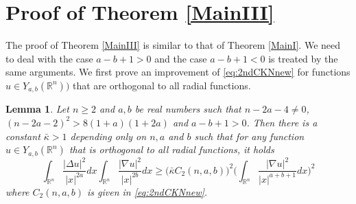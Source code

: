 \documentclass[a4paper,12pt]{article}
\theoremstyle{plain}
\newtheorem{lemma}[theorem]{Lemma}
\theoremstyle{definition}
\theoremstyle{remark}
\def\R{\mathbb R}%
\def\irn{\int_{\R^n}}
\numberwithin{equation}{section}
\begin{document}
\section{Proof of Theorem \ref{MainIII}}\label{s5}
The proof of Theorem \ref{MainIII} is similar to that of Theorem \ref{MainI}. We need to  deal with the case $a -b + 1 > 0$ and the case $a -b + 1< 0$ is treated by the same arguments. We first prove an improvement of \eqref{eq:2ndCKNnew} for functions $u\in Y_{a,b}(\R^n))$ that are orthogonal to all radial functions.
\begin{lemma}\label{Improved2ndCKN1}
Let $n\geq 2$ and $a, b$ be real numbers such that $n-2a -4\not=0$, $(n-2a -2)^2 > 8(1+a)(1+2a)$ and $a-b +1 >0$. Then there is a constant ${\bar{\kappa} >1}$ depending only on $n, a$ and $b$ such that for any function $u\in Y_{a,b}(\R^n)$ that is orthogonal to all radial functions, it holds
\begin{equation*}%
\irn \frac{|\Delta u|^2}{|x|^{2a}} dx \irn \frac{|\nabla u|^2}{|x|^{2b}} dx \geq \Big(\bar{\kappa} C_2(n,a,b)\Big)^2 \Big(\irn \frac{|\nabla u|^2}{|x|^{a+b +1}} dx\Big)^2
\end{equation*}
where $C_2(n,a,b)$ is given in \eqref{eq:2ndCKNnew}.
\end{lemma}
\end{document}
